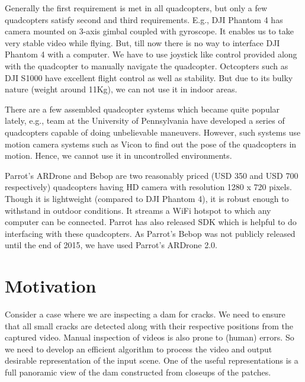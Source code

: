 Generally the first requirement is met in all quadcopters, but only a few
quadcopters satisfy second and third requirements. E.g., DJI Phantom 4
 has camera mounted on 3-axis gimbal coupled with gyroscope. It enables
us to take very stable video while flying. But, till now there is no way to interface DJI
Phantom 4 with a computer. We have to use joystick like control provided along
with the quadcopter to manually navigate the quadcopter.
Octcopters such as  DJI S1000 have excellent flight control as well as
stability. But due to its bulky nature (weight around 11Kg), we can not use it
in indoor areas.



There are a few assembled quadcopter systems which became quite popular lately,
e.g., team at the University of Pennsylvania have developed a series of
quadcopters capable of doing unbelievable maneuvers. However, such systems use motion camera
systems such as Vicon to find out the pose of the quadcopters in motion.
Hence, we cannot use it in uncontrolled environments.

Parrot's ARDrone and Bebop are two reasonably priced (USD 350 and USD
700 respectively) quadcopters having HD camera with resolution 1280 x 720
pixels. Though it is lightweight (compared to DJI Phantom 4), it is robust
enough to withstand in outdoor conditions. It streams a WiFi hotspot to which
any computer can be connected. Parrot has also released SDK which is helpful to
do interfacing with these quadcopters. As Parrot's Bebop was not publicly
released until the end of 2015, we have used Parrot's ARDrone 2.0.

\section{Motivation}

Consider a case where  we are inspecting a dam for cracks. We need to ensure
that all small cracks are detected along with their respective positions from
the captured video. Manual inspection of videos is also prone to (human) errors. 
So we need to develop an efficient algorithm to process the video and output desirable representation of the input
scene. One of the useful representations is a full panoramic view of the dam
constructed from closeups of the patches. 

